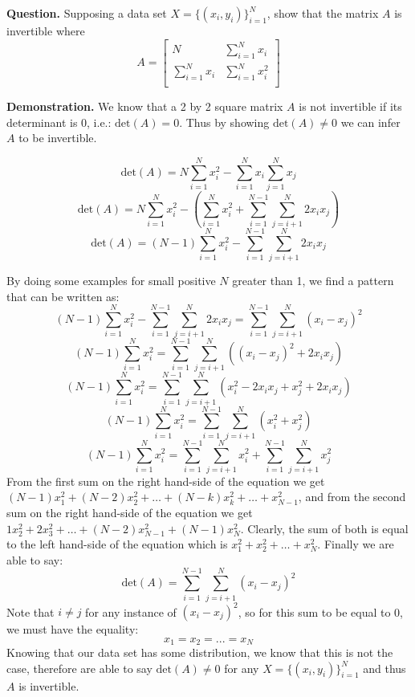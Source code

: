 \documentclass[a4paper, 11pt]{amsart}
\begin{document}
\textbf{Question.} Supposing a data set $X = \{(x_i, y_i)\}_{i=1}^{N}$, show that the matrix $A$ is invertible where
$$
A = 
\begin{bmatrix}
    N      & \sum_{i=1}^{N} x_i \\
    \sum_{i=1}^{N} x_i       & \sum_{i=1}^{N} x_i^2 \\
\end{bmatrix}
$$

\vspace{1cm}
\textbf{Demonstration.} We know that a 2 by 2 square matrix $A$ is not invertible if its determinant is 0, i.e.: $\text{det}(A) = 0$. Thus by showing $\text{det}(A) \ne 0$ we can infer $A$ to be invertible.

$$
\text{det}(A) = N\sum_{i=1}^{N} x_i^2 -  \sum_{i=1}^{N} x_i \sum_{j=1}^{N} x_j
$$
$$
\text{det}(A) = N\sum_{i=1}^{N} x_i^2 - ( \sum_{i=1}^{N} x_i^2 + \sum_{i=1}^{N-1}\sum_{j=i+1}^{N} 2 x_i x_j )
$$
$$
\text{det}(A) = (N-1)\sum_{i=1}^{N} x_i^2 - \sum_{i=1}^{N-1}\sum_{j=i+1}^{N} 2 x_i x_j 
$$

By doing some examples for small positive $N$ greater than 1, we find a pattern that can be written as:
$$
(N-1)\sum_{i=1}^{N} x_i^2 - \sum_{i=1}^{N-1}\sum_{j=i+1}^{N} 2 x_i x_j = \sum_{i=1}^{N-1}\sum_{j=i+1}^{N} (x_i - x_j)^2 
$$
$$
(N-1)\sum_{i=1}^{N} x_i^2 = \sum_{i=1}^{N-1}\sum_{j=i+1}^{N} ((x_i - x_j)^2 + 2 x_i x_j )
$$
$$
(N-1)\sum_{i=1}^{N} x_i^2 = \sum_{i=1}^{N-1}\sum_{j=i+1}^{N} (x_i^2 - 2x_i x_j + x_j^2 + 2 x_i x_j )
$$
$$
(N-1)\sum_{i=1}^{N} x_i^2 = \sum_{i=1}^{N-1}\sum_{j=i+1}^{N} (x_i^2+ x_j^2)
$$
$$
(N-1)\sum_{i=1}^{N} x_i^2 = \sum_{i=1}^{N-1}\sum_{j=i+1}^{N} x_i^2 + \sum_{i=1}^{N-1}\sum_{j=i+1}^{N} x_j^2
$$
From the first sum on the right hand-side of the equation we get $(N-1)x_1^2 + (N-2)x_2^2 + \ldots + (N-k)x_k^2 + \ldots + x_{N-1}^2$, and from the second sum on the right hand-side of the equation we get $1x_2^2 + 2x_3^2 + \ldots + (N-2)x_{N-1}^2 + (N-1)x_N^2$. Clearly, the sum of both is equal to the left hand-side of the equation which is $x_1^2 + x_2^2 + \ldots + x_N^2$. Finally we are able to say:
$$
\text{det}(A) = \sum_{i=1}^{N-1}\sum_{j=i+1}^{N} (x_i - x_j)^2
$$
Note that $i\ne j$ for any instance of $(x_i - x_j)^2$, so for this sum to be equal to 0, we must have the equality:
$$
x_1 = x_2 = ... = x_N
$$
Knowing that our data set has some distribution, we know that this is not the case, therefore are able to say $\text{det}(A) \ne 0$ for any $X = \{(x_i, y_i)\}_{i=1}^{N}$ and thus $A$ is invertible.
\end{document}
